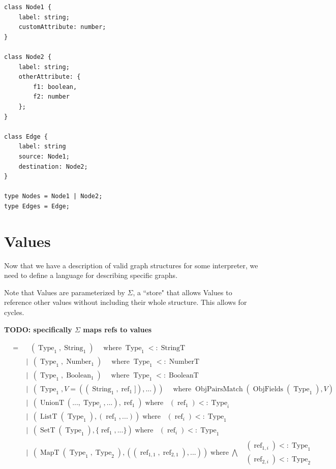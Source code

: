 \documentclass{article}
\DeclareMathOperator{\StringT}{StringT}
\DeclareMathOperator{\NumberT}{NumberT}
\DeclareMathOperator{\BooleanT}{BooleanT}
\DeclareMathOperator{\ListT}{ListT}
\DeclareMathOperator{\SetT}{SetT}
\DeclareMathOperator{\MapT}{MapT}
\DeclareMathOperator{\UnionT}{UnionT}
\DeclareMathOperator{\String}{String}
\DeclareMathOperator{\Number}{Number}
\DeclareMathOperator{\Boolean}{Boolean}
\DeclareMathOperator{\Type}{Type}
\DeclareMathOperator{\Value}{Value_\Sigma}
\DeclareMathOperator{\StringV}{StringV_\Sigma}
\DeclareMathOperator{\NumberV}{NumberV_\Sigma}
\DeclareMathOperator{\BooleanV}{BooleanV_\Sigma}
\DeclareMathOperator{\ObjV}{ObjV_\Sigma}
\DeclareMathOperator{\ListV}{ListV_\Sigma}
\DeclareMathOperator{\SetV}{SetV_\Sigma}
\DeclareMathOperator{\MapV}{MapV_\Sigma}
\DeclareMathOperator{\UnionV}{UnionV_\Sigma}
\DeclareMathOperator{\ValueType}{ValueType_\Sigma}
\DeclareMathOperator{\textref}{ref}
\DeclareMathOperator{\ObjFields}{ObjFields}
\DeclareMathOperator{\ObjPairsMatch}{ObjPairsMatch}
\DeclareMathOperator{\where}{ where }
\newcommand{\ValueRef}{\textref}
\begin{document}
\begin{verbatim}
class Node1 {
    label: string;
    customAttribute: number;
}

class Node2 {
    label: string;
    otherAttribute: {
        f1: boolean,
        f2: number
    };
}

class Edge {
    label: string
    source: Node1;
    destination: Node2;
}

type Nodes = Node1 | Node2;
type Edges = Edge;
\end{verbatim}

\section{Values}

Now that we have a description of valid graph structures for some
interpreter, we need to define a language for describing specific 
graphs. 

Note that Values are parameterized by \(\Sigma\), a ``store" that
allows Values to reference other values without including their 
whole structure. This allows for cycles. 

\textbf{TODO: specifically \(\Sigma\) maps refs to values}

\begin{align*}
    \Value =& \StringV(\Type_1, \String_1) \quad\where \Type_1 <: \StringT \\
    &| \NumberV(\Type_1, \Number_1) \quad\where \Type_1 <: \NumberT \\
    &| \BooleanV(\Type_1, \Boolean_1) \quad\where \Type_1 <: \BooleanT \\
    &| \ObjV(\Type_1, V=((\String_1, \ValueRef_1]), ...)) \quad\where 
    \ObjPairsMatch(\ObjFields(\Type_1), V) \\
    &| \UnionV(\UnionT(..., \Type_i, ...), \ValueRef_1) \where
    \ValueType(\ValueRef_1) <: \Type_i\\
    &| \ListV(\ListT(\Type_1), (\ValueRef_1, ...)) \where \ValueType(\ValueRef_i) <: \Type_1 \\
    &| \SetV(\SetT(\Type_1), \{\ValueRef_1, ...\}) \where \ValueType(\ValueRef_i) <: \Type_1 \\
    &| \MapV(\MapT(\Type_1, \Type_2), ((\ValueRef_{1,1}, \ValueRef_{2,1}), ...)) \where \bigwedge
    \begin{aligned}
        \ValueType(\ValueRef_{1, i}) <: \Type_1 \\
        \ValueType(\ValueRef_{2, i}) <: \Type_2 
    \end{aligned}\\
\end{align*}
\end{document}
